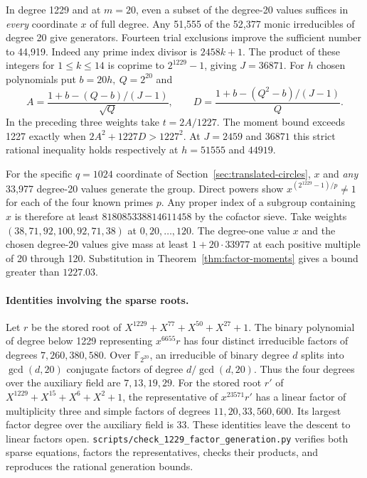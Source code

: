 \documentclass[11pt]{article}
\begin{document}
In degree 1229 and at \(m=20\), even a subset of the degree-20 values
suffices in \emph{every} coordinate \(x\) of full degree. Any 51,555
of the 52,377 monic irreducibles of degree 20 give generators.
Fourteen trial exclusions improve the sufficient number to 44,919.
Indeed any prime index divisor is \(2458k+1\). The product of these
integers for \(1\le k\le14\) is coprime to \(2^{1229}-1\), giving
\(J=36871\). For \(h\) chosen polynomials put \(b=20h,\ Q=2^{20}\)
and
\[
 A=\frac{1+b-(Q-b)/(J-1)}{\sqrt Q},\qquad
 D=\frac{1+b-(Q^2-b)/(J-1)}{Q}.
\]
In the preceding three weights take \(t=2A/1227\). The moment bound
exceeds 1227 exactly when \(2A^2+1227D>1227^2\). At \(J=2459\)
and \(36871\) this strict rational inequality holds respectively
at \(h=51555\) and \(44919\).

For the specific \(q=1024\) coordinate of
Section~\ref{sec:translated-circles}, \(x\) and \emph{any} 33,977
degree-20 values generate the group. Direct powers show
\(x^{(2^{1229}-1)/p}\ne1\) for each of the four known primes \(p\).
Any proper index of a subgroup containing \(x\) is therefore at least
\(818085338814611458\) by the cofactor sieve. Take weights
\((38,71,92,100,92,71,38)\) at \(0,20,\ldots,120\).
The degree-one value \(x\) and the chosen degree-20 values give mass
at least \(1+20\cdot33977\) at each positive multiple of 20 through
120. Substitution in Theorem~\ref{thm:factor-moments} gives a
bound greater than \(1227.03\).

\paragraph{Identities involving the sparse roots.}
Let \(r\) be the stored root of \(X^{1229}+X^{77}+X^{50}+X^{27}+1\).
The binary polynomial of degree below 1229 representing \(x^{6655}r\)
has four distinct irreducible factors of degrees \(7,260,380,580\).
Over \(\mathbb F_{2^{20}}\), an irreducible of binary degree \(d\)
splits into \(\gcd(d,20)\) conjugate factors of degree \(d/\gcd(d,20)\).
Thus the four degrees over the auxiliary field are \(7,13,19,29\).
For the stored root \(r'\) of \(X^{1229}+X^{15}+X^6+X^2+1\), the
representative of \(x^{23571}r'\) has a linear factor of multiplicity
three and simple factors of degrees \(11,20,33,560,600\).
Its largest factor degree over the auxiliary field is 33.
These identities leave the descent to linear factors open.
\nolinkurl{scripts/check_1229_factor_generation.py} verifies both
sparse equations, factors the representatives, checks their products,
and reproduces the rational generation bounds.
\end{document}
